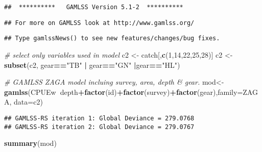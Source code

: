 \documentclass[]{article}
\newenvironment{Shaded}{\begin{snugshade}}{\end{snugshade}}
\newcommand{\KeywordTok}[1]{\textcolor[rgb]{0.13,0.29,0.53}{\textbf{#1}}}
\newcommand{\DataTypeTok}[1]{\textcolor[rgb]{0.13,0.29,0.53}{#1}}
\newcommand{\DecValTok}[1]{\textcolor[rgb]{0.00,0.00,0.81}{#1}}
\newcommand{\StringTok}[1]{\textcolor[rgb]{0.31,0.60,0.02}{#1}}
\newcommand{\CommentTok}[1]{\textcolor[rgb]{0.56,0.35,0.01}{\textit{#1}}}
\newcommand{\OperatorTok}[1]{\textcolor[rgb]{0.81,0.36,0.00}{\textbf{#1}}}
\newcommand{\NormalTok}[1]{#1}
\begin{document}
\begin{verbatim}
##  **********   GAMLSS Version 5.1-2  **********
\end{verbatim}

\begin{verbatim}
## For more on GAMLSS look at http://www.gamlss.org/
\end{verbatim}

\begin{verbatim}
## Type gamlssNews() to see new features/changes/bug fixes.
\end{verbatim}

\begin{Shaded}
\begin{Highlighting}[]
\CommentTok{# select only variables used in model}
\NormalTok{c2 <-}\StringTok{ }\NormalTok{catch[,}\KeywordTok{c}\NormalTok{(}\DecValTok{1}\NormalTok{,}\DecValTok{14}\NormalTok{,}\DecValTok{22}\NormalTok{,}\DecValTok{25}\NormalTok{,}\DecValTok{28}\NormalTok{)]}
\NormalTok{c2 <-}\StringTok{ }\KeywordTok{subset}\NormalTok{(c2, gear}\OperatorTok{==}\StringTok{"TB"} \OperatorTok{|}\StringTok{ }\NormalTok{gear}\OperatorTok{==}\StringTok{"GN"} \OperatorTok{|}\NormalTok{gear}\OperatorTok{==}\StringTok{"HL"}\NormalTok{)}

\CommentTok{# GAMLSS ZAGA model incluing survey, area, depth & gear. }
\NormalTok{mod<-}\KeywordTok{gamlss}\NormalTok{(CPUEw}\OperatorTok{~}\NormalTok{depth}\OperatorTok{+}\KeywordTok{factor}\NormalTok{(id)}\OperatorTok{+}\KeywordTok{factor}\NormalTok{(survey)}\OperatorTok{+}\KeywordTok{factor}\NormalTok{(gear),}\DataTypeTok{family=}\NormalTok{ZAGA, }\DataTypeTok{data=}\NormalTok{c2) }
\end{Highlighting}
\end{Shaded}

\begin{verbatim}
## GAMLSS-RS iteration 1: Global Deviance = 279.0768 
## GAMLSS-RS iteration 2: Global Deviance = 279.0767
\end{verbatim}

\begin{Shaded}
\begin{Highlighting}[]
\KeywordTok{summary}\NormalTok{(mod)}
\end{Highlighting}
\end{Shaded}
\end{document}
